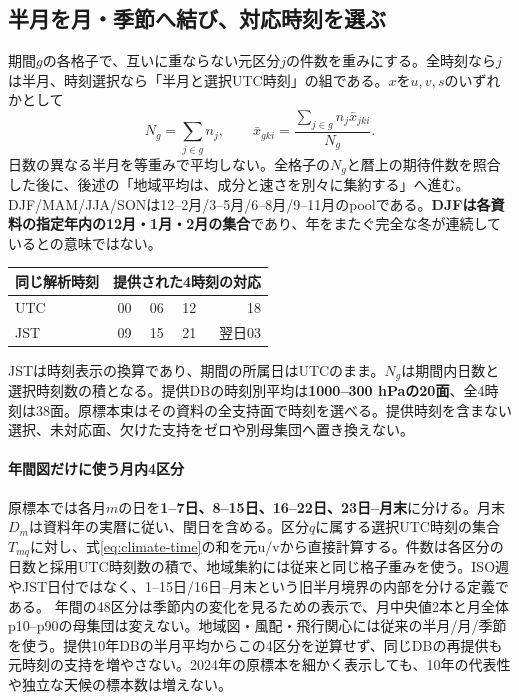 \documentclass[11pt,a4paper]{article}
\begin{document}
\clearpage
\subsection{半月を月・季節へ結び、対応時刻を選ぶ}\label{th:climate-periods}
期間$g$の各格子で、互いに重ならない元区分$j$の件数を重みにする。全時刻なら$j$は半月、時刻選択なら「半月と選択UTC時刻」の組である。$x$を$u,v,s$のいずれかとして
\begin{equation}
 N_g=\sum_{j\in g} n_j,\qquad
 \bar x_{gki}=\frac{\sum_{j\in g} n_j\bar x_{jki}}{N_g}.
 \label{eq:climate-pool-time}
\end{equation}
日数の異なる半月を等重みで平均しない。全格子の$N_g$と暦上の期待件数を照合した後に、後述の「地域平均は、成分と速さを別々に集約する」へ進む。
DJF/MAM/JJA/SONは12--2月/3--5月/6--8月/9--11月のpoolである。\textbf{DJFは各資料の指定年内の12月・1月・2月の集合}であり、年をまたぐ完全な冬が連続しているとの意味ではない。

\begin{center}\small
\begin{tabular}{@{}lrrrr@{}}
\toprule 同じ解析時刻 & \multicolumn{4}{c}{提供された4時刻の対応} \\\midrule
UTC & 00 & 06 & 12 & 18 \\
JST & 09 & 15 & 21 & 翌日03 \\\bottomrule
\end{tabular}
\end{center}
JSTは時刻表示の換算であり、期間の所属日はUTCのまま。$N_g$は期間内日数と選択時刻数の積となる。提供DBの時刻別平均は\textbf{1000--300 hPaの20面}、全4時刻は38面。原標本束はその資料の全支持面で時刻を選べる。提供時刻を含まない選択、未対応面、欠けた支持をゼロや別母集団へ置き換えない。

\paragraph{年間図だけに使う月内4区分}
原標本では各月$m$の日を\textbf{1--7日、8--15日、16--22日、23日--月末}に分ける。月末$D_m$は資料年の実暦に従い、閏日を含める。区分$q$に属する選択UTC時刻の集合$T_{mq}$に対し、式\eqref{eq:climate-time}の和を元u/vから直接計算する。件数は各区分の日数と採用UTC時刻数の積で、地域集約には従来と同じ格子重みを使う。ISO週やJST日付ではなく、1--15日/16日--月末という旧半月境界の内部を分ける定義である。
年間の48区分は季節内の変化を見るための表示で、月中央値2本と月全体p10--p90の母集団は変えない。地域図・風配・飛行関心には従来の半月/月/季節を使う。提供10年DBの半月平均からこの4区分を逆算せず、同じDBの再提供も元時刻の支持を増やさない。2024年の原標本を細かく表示しても、10年の代表性や独立な天候の標本数は増えない。
\end{document}
